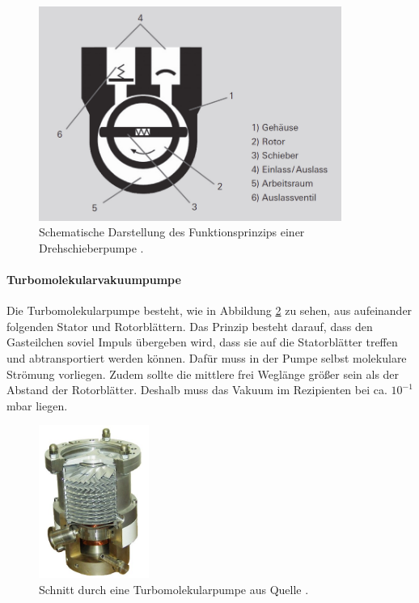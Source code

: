 \begin{figure}
  \centering
  \includegraphics[height = 7cm]{pics/dp.png}
  \caption{Schematische Darstellung des Funktionsprinzips einer Drehschieberpumpe \cite{pfeiffer:dp}.}
  \label{fig:dp}
\end{figure}
\FloatBarrier

\paragraph{Turbomolekularvakuumpumpe}
Die Turbomolekularpumpe besteht, wie in Abbildung \ref{fig:stm} zu sehen, aus aufeinander folgenden
Stator und Rotorblättern. Das Prinzip besteht darauf, dass den Gasteilchen soviel Impuls
übergeben wird, dass sie auf die Statorblätter treffen und abtransportiert werden können. Dafür
muss in der Pumpe selbst molekulare Strömung vorliegen. Zudem sollte die
mittlere frei Weglänge größer sein als der Abstand der Rotorblätter. Deshalb muss das Vakuum im
Rezipienten bei ca. $10^{-1}$ mbar liegen.

\begin{figure}
  \centering
  \includegraphics[height = 5cm]{pics/tm.jpg}
  \caption{Schnitt durch eine Turbomolekularpumpe aus Quelle \cite{wiki:tm}.}
  \label{fig:stm}
\end{figure}
\FloatBarrier

